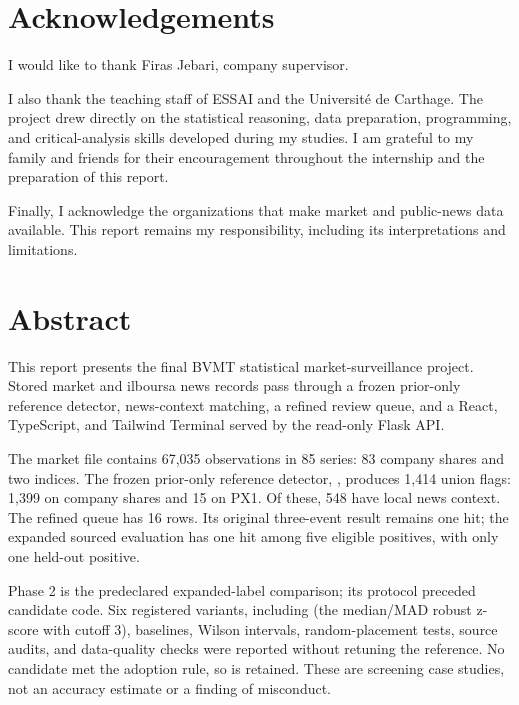 \documentclass[12pt,a4paper]{report}
\begin{document}
\makereportcover

\setcounter{page}{1}

\chapter*{Acknowledgements}
I would like to thank Firas Jebari, company supervisor.

I also thank the teaching staff of ESSAI and the Université de Carthage. The
project drew directly on the statistical reasoning, data preparation,
programming, and critical-analysis skills developed during my studies. I am
grateful to my family and friends for their encouragement throughout the
internship and the preparation of this report.

Finally, I acknowledge the organizations that make market and public-news data
available. This report remains my responsibility, including its interpretations
and limitations.
\clearpage

\chapter*{Abstract}
This report presents the final BVMT statistical market-surveillance project.
Stored market and ilboursa news records pass through a frozen prior-only
reference detector, news-context matching, a refined review queue, and a
React, TypeScript, and Tailwind Terminal served by the read-only Flask API.

The market file contains 67,035 observations in 85 series: 83 company shares
and two indices. The frozen prior-only reference detector, ,
produces 1,414 union flags: 1,399 on company shares and 15 on PX1. Of these,
548 have local news context. The refined queue has 16 rows. Its original
three-event result remains one hit; the expanded sourced evaluation has
one hit among five eligible positives, with only one held-out positive.

Phase 2 is the predeclared expanded-label comparison; its protocol
preceded candidate code. Six registered variants, including 
(the median/MAD robust z-score with cutoff 3),
baselines, Wilson intervals, random-placement tests, source audits, and
data-quality checks were reported without retuning the reference.
No candidate met the adoption rule, so  is retained.
These are screening case studies, not an accuracy estimate or a finding
of misconduct.
\clearpage
\end{document}
